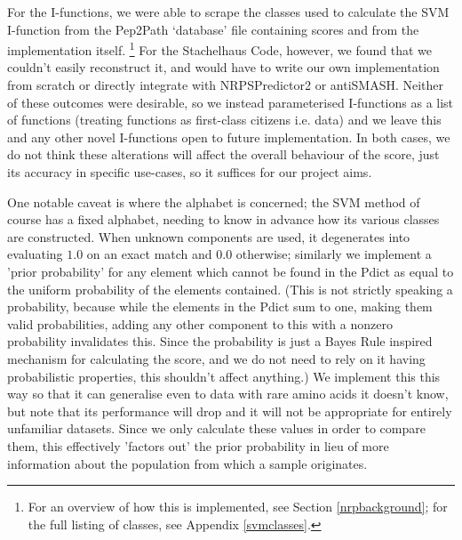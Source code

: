 \documentclass{l4proj}
\begin{document}
For the I-functions, we were able to scrape the classes used to calculate the SVM I-function from the Pep2Path `database' file containing scores and from the implementation itself. \footnote{For an overview of how this is implemented, see Section \ref{nrpbackground}; for the full listing of classes, see Appendix \ref{svmclasses}.} For the Stachelhaus Code, however, we found that we couldn't easily reconstruct it, and would have to write our own implementation from scratch or directly integrate with NRPSPredictor2 or antiSMASH. Neither of these outcomes were desirable, so we instead parameterised I-functions as a list of functions (treating functions as first-class citizens i.e. data) and we leave this and any other novel I-functions open to future implementation. In both cases, we do not think these alterations will affect the overall behaviour of the score, just its accuracy in specific use-cases, so it suffices for our project aims.

One notable caveat is where the alphabet is concerned; the SVM method of course has a fixed alphabet, needing to know in advance how its various classes are constructed. When unknown components are used, it degenerates into evaluating \(1.0\) on an exact match and \(0.0\) otherwise; similarly we implement a 'prior probability' for any element which cannot be found in the Pdict as equal to the uniform probability of the elements contained. (This is not strictly speaking a probability, because while the elements in the Pdict sum to one, making them valid probabilities, adding any other component to this with a nonzero probability invalidates this. Since the probability is just a Bayes Rule inspired mechanism for calculating the score, and we do not need to rely on it having probabilistic properties, this shouldn't affect anything.)  We implement this this way so that it can generalise even to data with rare amino acids it doesn't know, but note that its performance will drop and it will not be appropriate for entirely unfamiliar datasets. Since we only calculate these values in order to compare them, this effectively 'factors out' the prior probability in lieu of more information about the population from which a sample originates.
\end{document}
